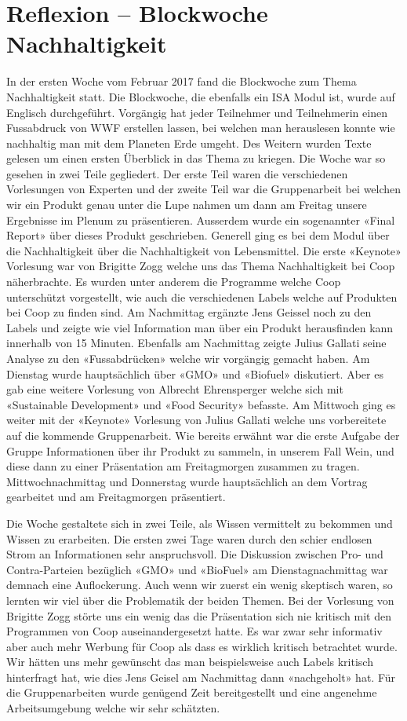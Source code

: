 \section{Reflexion – Blockwoche Nachhaltigkeit }
In der ersten Woche vom Februar 2017 fand die Blockwoche zum Thema Nachhaltigkeit statt. Die Blockwoche, die ebenfalls ein ISA Modul ist, wurde auf Englisch durchgeführt. Vorgängig hat jeder Teilnehmer und Teilnehmerin einen Fussabdruck von WWF erstellen lassen, bei welchen man herauslesen konnte wie nachhaltig man mit dem Planeten Erde umgeht. Des Weitern wurden Texte gelesen um einen ersten Überblick in das Thema zu kriegen. Die Woche war so gesehen in zwei Teile gegliedert. Der erste Teil waren die verschiedenen Vorlesungen von Experten und der zweite Teil war die Gruppenarbeit bei welchen wir ein Produkt genau unter die Lupe nahmen um dann am Freitag unsere Ergebnisse im Plenum zu präsentieren. Ausserdem wurde ein sogenannter «Final Report» über dieses Produkt geschrieben. Generell ging es bei dem Modul über die Nachhaltigkeit über die Nachhaltigkeit von Lebensmittel. 
Die erste «Keynote» Vorlesung war von Brigitte Zogg welche uns das Thema Nachhaltigkeit bei Coop näherbrachte. Es wurden unter anderem die Programme welche Coop unterschützt vorgestellt, wie auch die verschiedenen Labels welche auf Produkten bei Coop zu finden sind. Am Nachmittag ergänzte Jens Geissel noch zu den Labels und zeigte wie viel Information man über ein Produkt herausfinden kann innerhalb von 15 Minuten. Ebenfalls am Nachmittag zeigte Julius Gallati seine Analyse zu den «Fussabdrücken» welche wir vorgängig gemacht haben. 
Am Dienstag wurde hauptsächlich über «GMO» und «Biofuel» diskutiert. Aber es gab eine weitere Vorlesung von Albrecht Ehrensperger welche sich mit «Sustainable Development» und «Food Security» befasste. 
Am Mittwoch ging es weiter mit der «Keynote» Vorlesung von Julius Gallati welche uns vorbereitete auf die kommende Gruppenarbeit. Wie bereits erwähnt war die erste Aufgabe der Gruppe Informationen über ihr Produkt zu sammeln, in unserem Fall Wein, und diese dann zu einer Präsentation am Freitagmorgen zusammen zu tragen. Mittwochnachmittag und Donnerstag wurde hauptsächlich an dem Vortrag gearbeitet und am Freitagmorgen präsentiert. 

Die Woche gestaltete sich in zwei Teile, als Wissen vermittelt zu bekommen und Wissen zu erarbeiten.  Die ersten zwei Tage waren durch den schier endlosen Strom an Informationen sehr anspruchsvoll. Die Diskussion zwischen Pro- und Contra-Parteien bezüglich «GMO» und «BioFuel» am Dienstagnachmittag war demnach eine Auflockerung. Auch wenn wir zuerst ein wenig skeptisch waren, so lernten wir viel über die Problematik der beiden Themen. Bei der Vorlesung von Brigitte Zogg störte uns ein wenig das die Präsentation sich nie kritisch mit den Programmen von Coop auseinandergesetzt hatte. Es war zwar sehr informativ aber auch mehr Werbung für Coop als dass es wirklich kritisch betrachtet wurde. Wir hätten uns mehr gewünscht das man beispielsweise auch Labels kritisch hinterfragt hat, wie dies Jens Geisel am Nachmittag dann «nachgeholt» hat. 
Für die Gruppenarbeiten wurde genügend Zeit bereitgestellt und eine angenehme Arbeitsumgebung welche wir sehr schätzten. 

